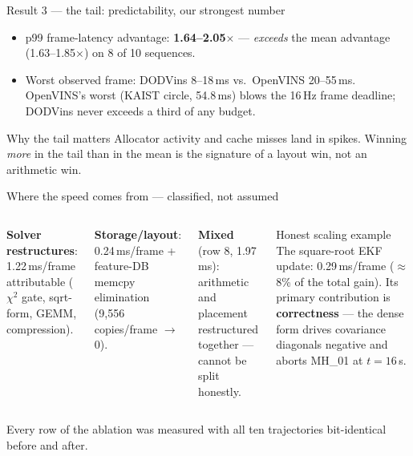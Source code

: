 \documentclass[aspectratio=169,11pt]{beamer}
\begin{document}
\begin{frame}{Result 3 --- the tail: predictability, our strongest number}
  \begin{itemize}
    \item p99 frame-latency advantage: \textbf{1.64--2.05$\times$} ---
          \emph{exceeds} the mean advantage (1.63--1.85$\times$) on 8 of 10
          sequences.
    \item Worst observed frame: DODVins 8--18\,ms vs.\ OpenVINS
          20--55\,ms. OpenVINS's worst (KAIST circle, 54.8\,ms) blows the
          16\,Hz frame deadline; DODVins never exceeds a third of any
          budget.
  \end{itemize}
  \vfill
  \begin{block}{Why the tail matters}
    Allocator activity and cache misses land in spikes. Winning \emph{more}
    in the tail than in the mean is the signature of a layout win, not an
    arithmetic win.
  \end{block}
\end{frame}

\begin{frame}{Where the speed comes from --- classified, not assumed}
  \begin{columns}
    \small
    \textbf{Solver restructures}: 1.22\,ms/frame attributable
    ($\chi^2$ gate, sqrt-form, GEMM, compression).

    \medskip
    \textbf{Storage/layout}: 0.24\,ms/frame + feature-DB memcpy
    elimination (9{,}556 copies/frame $\rightarrow$ 0).

    \medskip
    \textbf{Mixed} (row 8, 1.97\,ms): arithmetic and placement
    restructured together --- cannot be split honestly.

    \begin{block}{Honest scaling example}
      The square-root EKF update: 0.29\,ms/frame ($\approx$8\% of the
      total gain). Its primary contribution is \textbf{correctness} ---
      the dense form drives covariance diagonals negative and aborts
      MH\_01 at $t{=}16$\,s.
    \end{block}
  \end{columns}
  \vfill
  \small Every row of the ablation was measured with all ten trajectories
  bit-identical before and after.
\end{frame}
\end{document}
